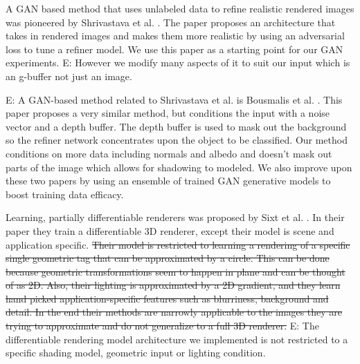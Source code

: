 \documentclass[10pt,twocolumn,letterpaper]{article}
\newcommand{\edit}[1]{{\color{red} E: #1}}
\begin{document}
A GAN based method that uses unlabeled data to refine realistic rendered images was pioneered by
Shrivastava et al. \cite{DBLP:journals/corr/ShrivastavaPTSW16}. The paper proposes an architecture that takes in rendered images and makes them more realistic by using an adversarial loss to tune a refiner model. We use this paper as a starting point for our GAN experiments.  %
\edit{However we modify many aspects of it to suit our input which is an g-buffer not just an image.}

\edit{A GAN-based method related to Shrivastava et al. is Bousmalis et al. \cite{Bousmalis2016UnsupervisedPD}. This paper proposes a very similar method, but conditions the input with a noise vector and a depth buffer.  The depth buffer is used to mask out the background so the refiner network concentrates upon the object to be classified.  Our method conditions on more data including normals and albedo and doesn't mask out parts of the image which allows for shadowing to modeled. We also improve upon these two papers by using an ensemble of trained GAN generative models to boost training data efficacy.}

Learning, partially differentiable renderers was proposed by Sixt et al. \cite{DBLP:journals/corr/SixtWL17}. In their paper they train a differentiable 3D renderer, except their model is scene and application specific. 
\sout{Their model is restricted to learning a rendering of a specific single geometric tag that can be approximated by a circle. This can be done because geometric transformations seem to happen in plane and can be thought of as 2D.  Also, their lighting is approximated by a 2D gradient, and they learn hand picked application-specific features such as blurriness, background and detail.  In the end their methods are narrowly applicable to the images they are trying to approximate and do not generalize to a full 3D renderer.}
\edit{ The differentiable rendering model architecture we implemented is not restricted to a specific shading model, geometric input or lighting condition.}
\end{document}
